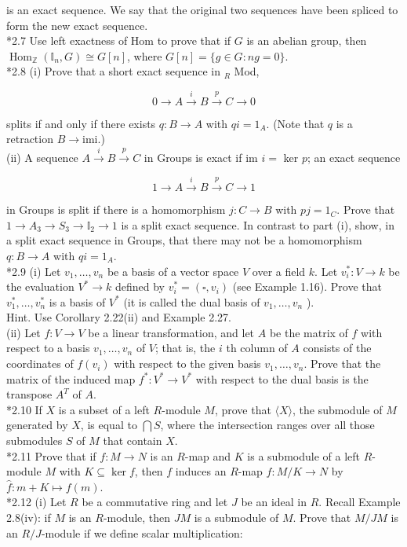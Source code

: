 \documentclass[10pt, letterpaper]{article}
\begin{document}
is an exact sequence. We say that the original two sequences have been spliced to form the new exact sequence.\\
*2.7 Use left exactness of Hom to prove that if $G$ is an abelian group, then $\operatorname{Hom}_{\mathbb{Z}}\left(\mathbb{I}_{n}, G\right) \cong G[n]$, where $G[n]=\{g \in G: n g=0\}$.\\
*2.8 (i) Prove that a short exact sequence in ${ }_{R}$ Mod,

$$
0 \rightarrow A \xrightarrow{i} B \xrightarrow{p} C \rightarrow 0
$$

splits if and only if there exists $q: B \rightarrow A$ with $q i=1_{A}$. (Note that $q$ is a retraction $B \rightarrow \mathrm{imi}$.)\\
(ii) A sequence $A \xrightarrow{i} B \xrightarrow{p} C$ in Groups is exact if im $i=$ ker $p$; an exact sequence

$$
1 \rightarrow A \xrightarrow{i} B \xrightarrow{p} C \rightarrow 1
$$

in Groups is split if there is a homomorphism $j: C \rightarrow B$ with $p j=1_{C}$. Prove that $1 \rightarrow A_{3} \rightarrow S_{3} \rightarrow \mathbb{I}_{2} \rightarrow 1$ is a split exact sequence. In contrast to part (i), show, in a split exact sequence in Groups, that there may not be a homomorphism $q: B \rightarrow A$ with $q i=1_{A}$.\\
*2.9 (i) Let $v_{1}, \ldots, v_{n}$ be a basis of a vector space $V$ over a field $k$. Let $v_{i}^{*}: V \rightarrow k$ be the evaluation $V^{*} \rightarrow k$ defined by $v_{i}^{*}=\left(\square, v_{i}\right)$ (see Example 1.16). Prove that $v_{1}^{*}, \ldots, v_{n}^{*}$ is a basis of $V^{*}$ (it is called the dual basis of $v_{1}, \ldots, v_{n}$ ).\\
Hint. Use Corollary 2.22(ii) and Example 2.27.\\
(ii) Let $f: V \rightarrow V$ be a linear transformation, and let $A$ be the matrix of $f$ with respect to a basis $v_{1}, \ldots, v_{n}$ of $V$; that is, the $i$ th column of $A$ consists of the coordinates of $f\left(v_{i}\right)$ with respect to the given basis $v_{1}, \ldots, v_{n}$. Prove that the matrix of the induced map $f^{*}: V^{*} \rightarrow V^{*}$ with respect to the dual basis is the transpose $A^{T}$ of $A$.\\
*2.10 If $X$ is a subset of a left $R$-module $M$, prove that $\langle X\rangle$, the submodule of $M$ generated by $X$, is equal to $\bigcap S$, where the intersection ranges over all those submodules $S$ of $M$ that contain $X$.\\
*2.11 Prove that if $f: M \rightarrow N$ is an $R$-map and $K$ is a submodule of a left $R$-module $M$ with $K \subseteq \operatorname{ker} f$, then $f$ induces an $R$-map $\widehat{f}: M / K \rightarrow N$ by $\widehat{f}: m+K \mapsto f(m)$.\\
*2.12 (i) Let $R$ be a commutative ring and let $J$ be an ideal in $R$. Recall Example 2.8(iv): if $M$ is an $R$-module, then $J M$ is a submodule of $M$. Prove that $M / J M$ is an $R / J$-module if we define scalar multiplication:
\end{document}

